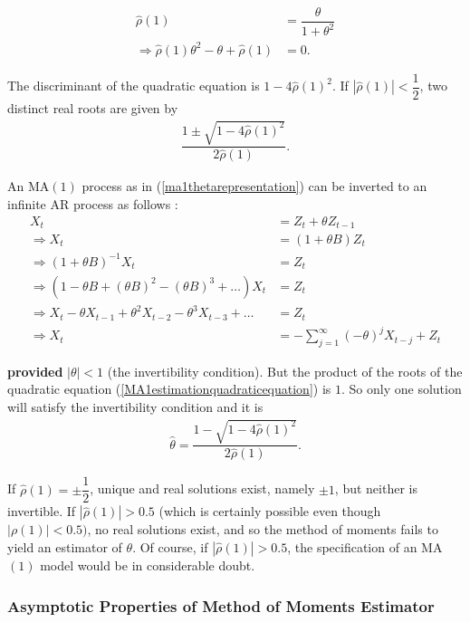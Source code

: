 \documentclass[11pt, a4paper]{article}
\numberwithin{equation}{section}
\theoremstyle{definition}
\begin{document}
\begin{align}
\hat{\rho}(1) &= \dfrac{\theta}{1 + \theta^2} \nonumber \\[0.2em]
\Rightarrow \hat{\rho}(1) \theta^2 - \theta + \hat{\rho}(1) &= 0. \label{MA1estimationquadraticequation}
\end{align}

The discriminant of the quadratic equation is $1 - 4\hat{\rho}(1)^2$. If $|\hat{\rho}(1)| < \dfrac{1}{2}$, two distinct real roots are given by
\begin{align*}
\dfrac{1 \pm \sqrt{1 - 4\hat{\rho}(1)^2}}{2\hat{\rho}(1)}.
\end{align*}

An MA$(1)$ process as in (\ref{ma1thetarepresentation}) can be inverted to an infinite AR process as follows :
\begin{align*}
X_t &= Z_t + \theta Z_{t-1} \\[0.2em]
\Rightarrow X_t &= (1 + \theta B) Z_t \\[0.2em]
\Rightarrow (1 + \theta B)^{-1} X_t &= Z_t \\[0.2em]
\Rightarrow (1 - \theta B + (\theta B)^2 - (\theta B)^3 + \ldots) X_t &= Z_t \\[0.2em]
\Rightarrow X_t - \theta X_{t-1} + \theta^2 X_{t-2} - \theta^3 X_{t-3} + \ldots &= Z_t \\[0.2em]
\Rightarrow X_t &= - \sum \limits_{j = 1}^{\infty} (-\theta)^j X_{t-j} + Z_t
\end{align*}

\textbf{provided} $|\theta| < 1$ (the invertibility condition). But the product of the roots of the quadratic equation (\ref{MA1estimationquadraticequation}) is $1$. So only one solution will satisfy the invertibility condition and it is
\begin{align*}
\hat{\theta} = \dfrac{1 - \sqrt{1 - 4\hat{\rho}(1)^2}}{2\hat{\rho}(1)}.
\end{align*}

If $\hat{\rho}(1) = \pm \dfrac{1}{2}$, unique and real solutions exist, namely $\pm 1$, but neither is invertible. If $|\hat{\rho}(1)| > 0.5$ (which is certainly possible even though $|\rho(1)| < 0.5)$, no real solutions exist, and so the method of moments fails to yield an estimator of $\theta$. Of course, if $|\hat{\rho}(1)| > 0.5$, the specification of an MA$(1)$ model would be in considerable doubt.

\subsubsection{Asymptotic Properties of Method of Moments Estimator}
\end{document}
